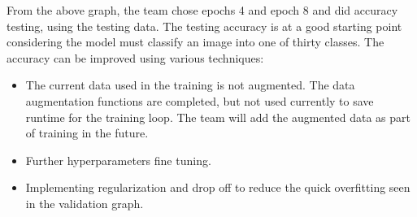 \documentclass{article} %
\begin{document}
From the above graph, the team chose epochs 4 and epoch 8 and did accuracy testing, using the testing data. The testing accuracy is at a good starting point considering the model must classify an image into one of thirty classes. The accuracy can be improved using various techniques:
\begin{itemize}
    \item The current data used in the training is not augmented. The data augmentation functions are completed, but not used currently to save runtime for the training loop. The team will add the augmented data as part of training in the future.
    \item Further hyperparameters fine tuning.
    \item Implementing regularization and drop off to reduce the quick overfitting seen in the validation graph.
\end{itemize}


\label{last_page}



\end{document}
